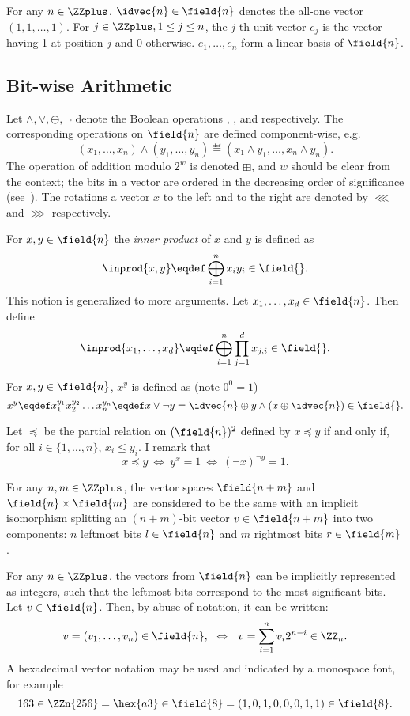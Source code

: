 For any $n \in \ZZplus$, $\idvec{n} \in \field{n}$ denotes the all-one vector $(1,1,\ldots,1)$. For $j \in \ZZplus,1\le j \le n$, the $j$-th unit vector $e_j$ is the vector having 1 at position $j$ and 0 otherwise. $e_1, \ldots, e_n$ form a linear basis of $\field{n}$.


\subsection{Bit-wise Arithmetic}
Let $\land,\lor,\oplus,\lnot$ denote the Boolean operations \tand{}, \tor{}, \txor{} and \tnot{} respectively. The corresponding operations on $\field{n}$ are defined  component-wise, e.g.
$$
(x_1, \ldots, x_n) \land (y_1, \ldots, y_n) \eqdef (x_1 \land y_1, \ldots, x_n \land y_n).
$$
The operation of addition modulo $2^w$ is denoted $\boxplus$, and $w$ should be clear from the context; the bits in a vector are ordered in the decreasing order of significance (see~). The rotations a vector $x$ to the left and to the right are denoted by $\lll$ and $\ggg$ respectively. 

For $x, y \in \field{n}$ the \emph{inner product} of $x$ and $y$ is defined as
$$
\inprod{x,y} \eqdef \bigoplus_{i=1}^n x_i y_i \in \field{}.
$$
This notion is generalized to more arguments. Let $x_1,\dots,x_d \in \field{n}$. Then define
$$
\inprod{x_1,\dots,x_d} \eqdef \bigoplus_{i=1}^{n} \prod_{j=1}^d x_{j,i} \in \field{}.
$$

For $x, y \in \field{n}$, $x^y$ is defined as (note $0^0 = 1$)
$$
x ^ y \eqdef x_1^{y_1}x_2^{y_2}\ldots x_n^{y_n} \eqdef 
x \lor \lnot y = \idvec{n} \oplus y \land (x \oplus \idvec{n}) \in \field{}.
$$

Let $\preceq$ be the partial relation on $(\field{n})^2$ defined by $x \preceq y$ if and only if, for all $i \in \{1,\ldots,n\}$, $x_i \leq y_i$. I remark that
$$
x \preceq y ~\Leftrightarrow~
y^x = 1 ~\Leftrightarrow~
(\lnot x)^{\lnot y} = 1.
$$


For any $n,m \in \ZZplus$, the vector spaces $\field{n+m}$ and $\field{n}\times \field{m}$ are considered to be the same with an implicit isomorphism splitting an $(n+m)$-bit vector $v \in \field{n+m}$ into two components: $n$ leftmost bits $l\in \field{n}$ and $m$ rightmost bits $r \in \field{m}$.

For any $n \in \ZZplus$, the vectors from $\field{n}$ can be implicitly represented as integers, such that the leftmost bits correspond to the most significant bits. Let $v \in \field{n}$. Then, by abuse of notation, it can be written:
$$
v = (v_1, \ldots, v_n) \in \field{n},
~~\Leftrightarrow~~
v = \sum_{i=1}^n v_i2^{n-i} \in \ZZ_n.$$
A hexadecimal vector notation may be used and indicated by a monospace font, for example
$$
163 \in \ZZn{256} = \hex{a3} \in \field{8} = (1, 0, 1, 0, 0, 0, 1, 1) \in \field{8}.
$$

